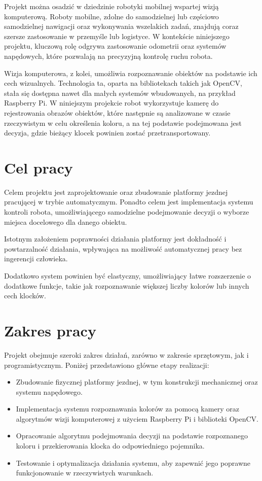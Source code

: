 Projekt można osadzić w dziedzinie robotyki mobilnej wspartej wizją komputerową. Roboty mobilne, zdolne do samodzielnej lub częściowo samodzielnej nawigacji oraz wykonywania wszelakich zadań, znajdują coraz szersze zastosowanie w przemyśle lub logistyce. W kontekście niniejszego projektu, kluczową rolę odgrywa zastosowanie odometrii oraz systemów napędowych, które pozwalają na precyzyjną kontrolę ruchu robota.

Wizja komputerowa, z kolei, umożliwia rozpoznawanie obiektów na podstawie ich cech wizualnych. Technologia ta, oparta na bibliotekach takich jak OpenCV, stała się dostępna nawet dla małych systemów wbudowanych, na przykład Raspberry Pi. W niniejszym projekcie robot wykorzystuje kamerę do rejestrowania obrazów obiektów, które następnie są analizowane w czasie rzeczywistym w celu określenia koloru, a na tej podstawie podejmowana jest decyzja, gdzie bieżący klocek powinien zostać przetransportowany.

\section{Cel pracy}
\label{sec:cel}

Celem projektu jest zaprojektowanie oraz zbudowanie platformy jezdnej pracującej w trybie automatycznym. Ponadto celem jest implementacja systemu kontroli robota, umożliwiającego samodzielne podejmowanie decyzji o wyborze miejsca docelowego dla danego obiektu.

Istotnym założeniem poprawności działania platformy jest dokładność i powtarzalność działania, wpływająca na możliwość automatycznej pracy bez ingerencji człowieka.

Dodatkowo system powinien być elastyczny, umożliwiający łatwe rozszerzenie o dodatkowe funkcje, takie jak rozpoznawanie większej liczby kolorów lub innych cech klocków.


\section{Zakres pracy}
\label{sec:zakres}

Projekt obejmuje szeroki zakres działań, zarówno w zakresie sprzętowym, jak i programistycznym. Poniżej przedstawiono główne etapy realizacji:

\begin{itemize}
    \item Zbudowanie fizycznej platformy jezdnej, w tym konstrukcji mechanicznej oraz systemu napędowego.
    \item Implementacja systemu rozpoznawania kolorów za pomocą kamery oraz algorytmów wizji komputerowej z użyciem Raspberry Pi i biblioteki OpenCV.
    \item Opracowanie algorytmu podejmowania decyzji na podstawie rozpoznanego koloru i przekierowania klocka do odpowiedniego pojemnika.
    \item Testowanie i optymalizacja działania systemu, aby zapewnić jego poprawne funkcjonowanie w rzeczywistych warunkach.
\end{itemize}


